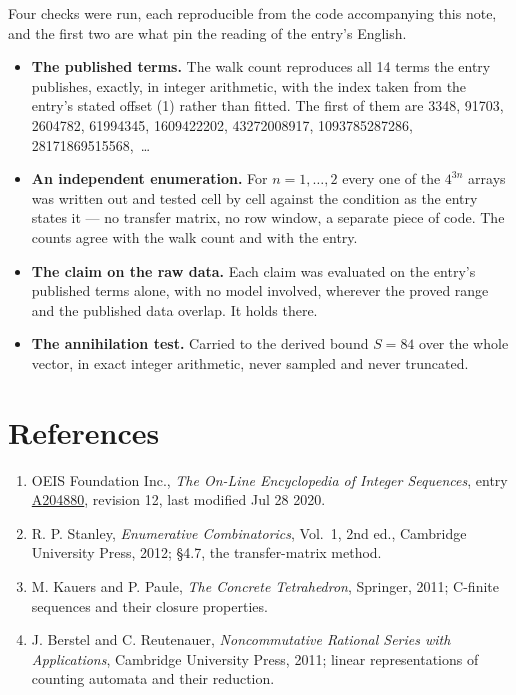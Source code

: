 \documentclass[11pt]{article}
\theoremstyle{definition}
\begin{document}
Four checks were run, each reproducible from the code accompanying this note, and the first two are what pin the reading of the entry's English.

\begin{itemize}

\item {\bfseries The published terms.} The walk count reproduces all 14 terms the entry publishes, exactly, in integer arithmetic, with the index taken from the entry's stated offset (1) rather than fitted. The first of them are 3348, 91703, 2604782, 61994345, 1609422202, 43272008917, 1093785287286, 28171869515568,~\dots

\item {\bfseries An independent enumeration.} For $n = 1,\dots,2$ every one of the $4^{3n}$ arrays was written out and tested cell by cell against the condition as the entry states it --- no transfer matrix, no row window, a separate piece of code. The counts agree with the walk count and with the entry.

\item {\bfseries The claim on the raw data.} Each claim was evaluated on the entry's published terms alone, with no model involved, wherever the proved range and the published data overlap. It holds there.

\item {\bfseries The annihilation test.} Carried to the derived bound $S = 84$ over the whole vector, in exact integer arithmetic, never sampled and never truncated.

\end{itemize}

\section{References}

\begin{enumerate}

\item OEIS Foundation Inc., \emph{The On-Line Encyclopedia of Integer Sequences}, entry \href{https://oeis.org/A204880}{A204880}, revision 12, last modified Jul 28 2020.

\item R. P. Stanley, \emph{Enumerative Combinatorics}, Vol.~1, 2nd ed., Cambridge University Press, 2012; \S4.7, the transfer-matrix method.

\item M. Kauers and P. Paule, \emph{The Concrete Tetrahedron}, Springer, 2011; C-finite sequences and their closure properties.

\item J. Berstel and C. Reutenauer, \emph{Noncommutative Rational Series with Applications}, Cambridge University Press, 2011; linear representations of counting automata and their reduction.

\end{enumerate}
\end{document}

